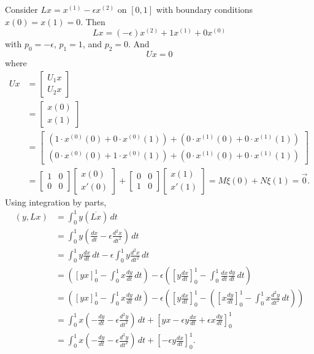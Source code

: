 \documentclass[11pt, oneside, a4paper]{article}
\begin{document}
Consider $Lx=x^{(1)} - \epsilon x^{(2)}$ on $[0,1]$ with boundary conditions $x(0)=x(1)=0$. Then
\[Lx = (-\epsilon) x^{(2)} + 1x^{(1)} + 0x^{(0)}\]
with $p_0 = -\epsilon$, $p_1 = 1$, and $p_2 = 0$. And
\[Ux=0\]
where
\begin{align*}
    Ux &= \begin{bmatrix} U_1x\\ U_2x \end{bmatrix}\\
    &= \begin{bmatrix} x(0)\\ x(1)\end{bmatrix} \\
        &= \begin{bmatrix}
    (1\cdot x^{(0)}(0) + 0\cdot x^{(0)}(1)) + (0\cdot x^{(1)}(0) + 0\cdot x^{(1)}(1))\\
    (0\cdot x^{(0)}(0) + 1\cdot x^{(0)}(1)) + (0\cdot x^{(1)}(0) + 0\cdot x^{(1)}(1)) \end{bmatrix}\\
    &=
\begin{bmatrix}
    1 & 0\\
    0 & 0
\end{bmatrix}
\begin{bmatrix}
    x(0)\\
    x'(0)
\end{bmatrix} +
\begin{bmatrix}
    0 & 0\\
    1 & 0
\end{bmatrix}
\begin{bmatrix}
    x(1)\\
    x'(1)
\end{bmatrix} =
M\xi(0) + N\xi(1)
= \vec{0}.
\end{align*}
Using integration by parts,
\begin{align*}
    (y, Lx) &= \int_0^1 y (\overline{Lx})\,dt\\
    &= \int_0^1 y (\frac{dx}{dt} - \epsilon \frac{d^2 x}{dt^2})\,dt\\
    &= \int_0^1 y\frac{dx}{dt}\,dt - \epsilon\int_0^1 y\frac{d^2 x}{dt^2}\,dt\\
    &= \left(\left[yx\right]_0^1 - \int_0^1 x\frac{dy}{dt}\,dt\right) - \epsilon\left(\left[y\frac{dx}{dt}\right]_0^1 - \int_0^1 \frac{dx}{dt}\frac{dy}{dt}\,dt\right)\\
    &= \left(\left[yx\right]_0^1 - \int_0^1 x\frac{dy}{dt}\,dt\right) - \epsilon\left(\left[y\frac{dx}{dt}\right]_0^1 - \left(\left[x\frac{dy}{dt}\right]_0^1 - \int_0^1 x\frac{d^2 y}{dt^2}\,dt\right)\right)\\
    &= \int_0^1 x\left(-\frac{dy}{dt} - \epsilon\frac{d^2 y}{dt^2}\right)\,dt + \left[yx - \epsilon y\frac{dx}{dt} + \epsilon x\frac{dy}{dt}\right]_0^1\\
    &= \int_0^1 x\left(-\frac{dy}{dt} - \epsilon\frac{d^2 y}{dt^2}\right)\,dt + \left[-\epsilon y\frac{dx}{dt}\right]_0^1.
\end{align*}
\end{document}
